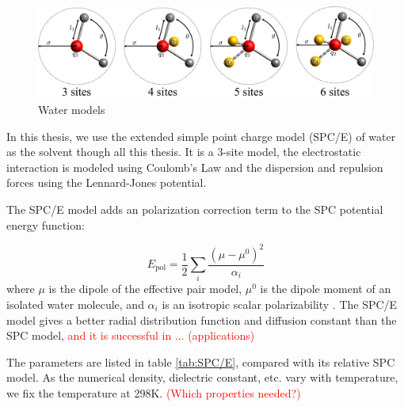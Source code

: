 \begin{figure}[h]
\begin{centering}
\includegraphics[width=0.75\columnwidth]{_figure/water}
\par\end{centering}

\caption{Water models\label{fig:Water-models}}
\end{figure}


In this thesis, we use the extended simple point charge model (SPC/E)
of water \citep{SPC/E} as the solvent though all this thesis.  It is a 3-site model, the electrostatic interaction is modeled using
Coulomb's Law and the dispersion and repulsion forces using the Lennard-Jones
potential.

The SPC/E model adds an polarization correction term to the SPC potential
energy function:

\[
E_{\mathrm{pol}}=\frac{1}{2}\sum_{i}\dfrac{(\mu-\mu^{0})^{2}}{\alpha_{i}}
\]
where $\mu$ is the dipole of the effective pair model, $\mu^{0}$
is the dipole moment of an isolated water molecule, and $\alpha_{i}$
is an isotropic scalar polarizability \citep{SPC/E}. The SPC/E model
gives a better radial distribution function and diffusion constant
than the SPC model, \textcolor{red}{and it is successful in ... (applications)}

The parameters are listed in table \ref{tab:SPC/E}, compared with
its relative SPC model. As the numerical density, dielectric constant,
etc. vary with temperature, we fix the temperature at 298K. \textcolor{red}{(Which
properties needed?)}

